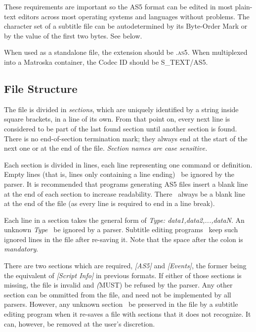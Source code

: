 \documentclass{spec}
\begin{document}
These requirements are important so the AS5 format can be edited in most plain-text editors
across most operating systems and languages without problems. The character set of a
subtitle file can be autodetermined by its Byte-Order Mark or by the value of the first
two bytes. See below.

When used as a standalone file, the extension should be \textsc{.as5}. When multiplexed
into a Matroska container, the Codec ID should be \textsc{S\_TEXT/AS5}.



\subsection{File Structure}
The file is divided in \emph{sections}, which are uniquely identified by a string inside
square brackets, in a line of its own. From that point on, every next line is considered
to be part of the last found section until another section is found. There is no end-of-section
termination mark; they always end at the start of the next one or at the end of the file.
\emph{Section names are case sensitive.}

Each section is divided in lines, each line representing one command or definition. Empty
lines (that is, lines only containing a line ending) \must\ be ignored by the parser.
It is recommended that programs generating AS5 files insert a blank line at the end of each
section to increase readability. There \must\ always be a blank line at the end of the file
(as every line is required to end in a line break).

Each line in a section takes the general form of \textit{Type: data1,data2,...,dataN}. An
unknown \textit{Type} \must\ be ignored by a parser. Subtitle editing programs \should\ keep
such ignored lines in the file after re-saving it. Note that the space after the colon is \emph{mandatory}.

There are two sections which are required, \emph{[AS5]} and \emph{[Events]}, the former being
the equivalent of \emph{[Script Info]} in previous formats. If either of those sections is
missing, the file is invalid and \emph(MUST) be refused by the parser. Any other section
can be ommitted from the file, and need not be implemented by all parsers. However, any unknown
section \must\ be preserved in the file by a subtitle editing program when it re-saves a
file with sections that it does not recognize. It can, however, be removed at the user's discretion.
\end{document}

